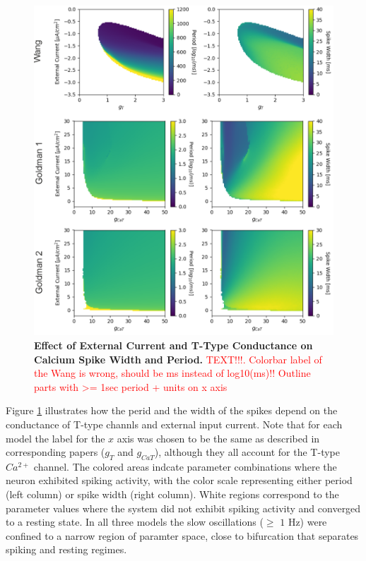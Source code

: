 \documentclass[../main.tex]{subfiles}
\begin{document}
\begin{figure}[!t]
    \centering
    \includegraphics[width=0.9\linewidth]{../img/ttx_block/ttx_block.png}
    \caption[Effect of External Current and T-Type Conductance on Calcium Spike Width and Period]{
        \textbf{Effect of External Current and T-Type Conductance on Calcium Spike Width and Period.} \textcolor{red}{TEXT!!!. Colorbar label of the Wang is wrong, should be ms instead of log10(ms)!! Outline parts with >= 1sec period + units on x axis}
    }
    \label{fig:models_ttx_block}
\end{figure}

Figure \ref{fig:models_ttx_block} illustrates how the perid and the width of the spikes depend on the conductance of T-type channls and external input current. Note that for each model the label for the $x$ axis was chosen to be the same as described in corresponding papers ($g_T$ and $g_{CaT}$), although they all account for the T-type $Ca^{2+}$ channel. The colored areas indcate parameter combinations where the neuron exhibited spiking activity, with the color scale representing either period (left column) or spike width (right column). White regions correspond to the parameter values where the system did not exhibit spiking activity and converged to a resting state. In all  three models the slow oscillations ($\geq$ $1$ Hz) were confined to a narrow region of paramter space, close to bifurcation that separates spiking and resting regimes.
\end{document}
